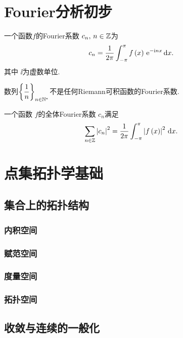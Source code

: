 \section{Fourier分析初步}

\begin{definition}[Fourier系数]
    一个函数$f$的Fourier系数 $c_n,\,n\in\mathbb{Z}$为
    \[   c_n= \frac{1}{2\pi} \int_{-\pi}^\pi f\left(x\right)\,\mathrm{e}^{-\mathrm{i} nx} \,\mathrm{d} x.  \]
    其中 $\ii$为虚数单位.
\end{definition}
\begin{example}\label{不是Fourier系数的例子}
    数列$\displaystyle \left\{ \frac{1}{n} \right\}_{n\in\mathbb{N}^*}$不是任何Riemann可积函数的Fourier系数.
\end{example}

\begin{theorem}[Parseval恒等式]\label{Parseval恒等式}
    一个函数 $f$的全体Fourier系数 $c_n$满足
    \[     \sum_{n\in\mathbb{Z}} \left|c_n\right|^2 =  \frac{1}{2\pi} \int_{-\pi}^\pi \left|f\left(x\right)\right|^2 \,\mathrm{d} x.    \]
\end{theorem}



\section{点集拓扑学基础}

\subsection{集合上的拓扑结构}


\subsubsection{内积空间}

\subsubsection{赋范空间}

\subsubsection{度量空间}

\subsubsection{拓扑空间}


\subsection{收敛与连续的一般化}
\begin{definition}[内点]\label{内点定义}
    
\end{definition}


